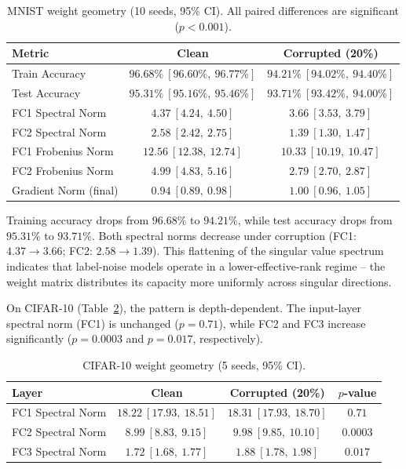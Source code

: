 \documentclass{article}
\begin{document}
\begin{table}[t]
  \centering
  \caption{MNIST weight geometry (10 seeds, 95\% CI). All paired differences are significant ($p < 0.001$).}
  \label{tab:spectral_mnist}
  \begin{tabular}{lcc}
    \toprule
    Metric & Clean & Corrupted (20\%) \\
    \midrule
    Train Accuracy & $96.68\%\ [96.60\%,\ 96.77\%]$ & $94.21\%\ [94.02\%,\ 94.40\%]$ \\
    Test Accuracy & $95.31\%\ [95.16\%,\ 95.46\%]$ & $93.71\%\ [93.42\%,\ 94.00\%]$ \\
    FC1 Spectral Norm & $4.37\ [4.24,\ 4.50]$ & $3.66\ [3.53,\ 3.79]$ \\
    FC2 Spectral Norm & $2.58\ [2.42,\ 2.75]$ & $1.39\ [1.30,\ 1.47]$ \\
    FC1 Frobenius Norm & $12.56\ [12.38,\ 12.74]$ & $10.33\ [10.19,\ 10.47]$ \\
    FC2 Frobenius Norm & $4.99\ [4.83,\ 5.16]$ & $2.79\ [2.70,\ 2.87]$ \\
    Gradient Norm (final) & $0.94\ [0.89,\ 0.98]$ & $1.00\ [0.96,\ 1.05]$ \\
    \bottomrule
  \end{tabular}
\end{table}

Training accuracy drops from $96.68\%$ to $94.21\%$, while test accuracy drops from $95.31\%$ to $93.71\%$. Both spectral norms decrease under corruption (FC1: $4.37\to3.66$; FC2: $2.58\to1.39$). This flattening of the singular value spectrum indicates that label-noise models operate in a lower-effective-rank regime -- the weight matrix distributes its capacity more uniformly across singular directions.

On CIFAR-10 (Table~\ref{tab:spectral_cifar}), the pattern is depth-dependent. The input-layer spectral norm (FC1) is unchanged ($p=0.71$), while FC2 and FC3 increase significantly ($p=0.0003$ and $p=0.017$, respectively).

\begin{table}[t]
  \centering
  \caption{CIFAR-10 weight geometry (5 seeds, 95\% CI).}
  \label{tab:spectral_cifar}
  \begin{tabular}{lccc}
    \toprule
    Layer & Clean & Corrupted (20\%) & $p$-value \\
    \midrule
    FC1 Spectral Norm & $18.22\ [17.93,\ 18.51]$ & $18.31\ [17.93,\ 18.70]$ & $0.71$ \\
    FC2 Spectral Norm & $8.99\ [8.83,\ 9.15]$ & $9.98\ [9.85,\ 10.10]$ & $0.0003$ \\
    FC3 Spectral Norm & $1.72\ [1.68,\ 1.77]$ & $1.88\ [1.78,\ 1.98]$ & $0.017$ \\
    \bottomrule
  \end{tabular}
\end{table}
\end{document}
